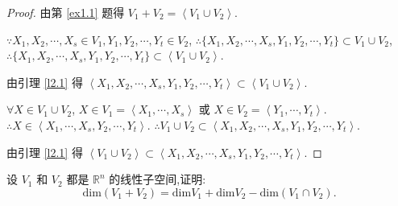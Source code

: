 \documentclass{ctexart}
\begin{document}
\begin{proof}
    由第 \ref{ex1.1} 题得 $V_1+V_2=\left<V_1\cup V_2\right>$.

    $\because X_1,X_2,\cdots,X_s\in V_1,Y_1,Y_2,\cdots,Y_t\in V_2$, $\therefore\{X_1,X_2,\cdots,X_s,Y_1,Y_2,\cdots,Y_t\}\subset V_1\cup V_2$, $\therefore\{X_1,X_2,\cdots,X_s,Y_1,Y_2,\cdots,Y_t\}\subset\left<V_1\cup V_2\right>$.
    
    由引理 \ref{l2.1} 得 $\left<X_1,X_2,\cdots,X_s,Y_1,Y_2,\cdots,Y_t\right>\subset\left<V_1\cup V_2\right>$.

    $\forall X\in V_1\cup V_2$, $X\in V_1=\left<X_1,\cdots,X_s\right>$ 或 $X\in V_2=\left<Y_1,\cdots,Y_t\right>$. $\therefore X\in\left<X_1,\cdots,X_s,Y_2,\cdots,Y_t\right>$. $\therefore V_1\cup V_2\subset\left<X_1,X_2,\cdots,X_s,Y_1,Y_2,\cdots,Y_t\right>$.
    
    由引理 \ref{l2.1} 得 $\left<V_1\cup V_2\right>\subset\left<X_1,X_2,\cdots,X_s,Y_1,Y_2,\cdots,Y_t\right>$.
\end{proof}
\begin{exercise}[有改动]\label{ex1.7}
设 $V_1$ 和 $V_2$ 都是 $\mathbb{R}^n$ 的线性子空间,证明:
$$\mathrm{dim}(V_1+V_2)=\mathrm{dim}V_1+\mathrm{dim}V_2-\mathrm{dim}(V_1\cap V_2).$$
\end{exercise}
\end{document}
